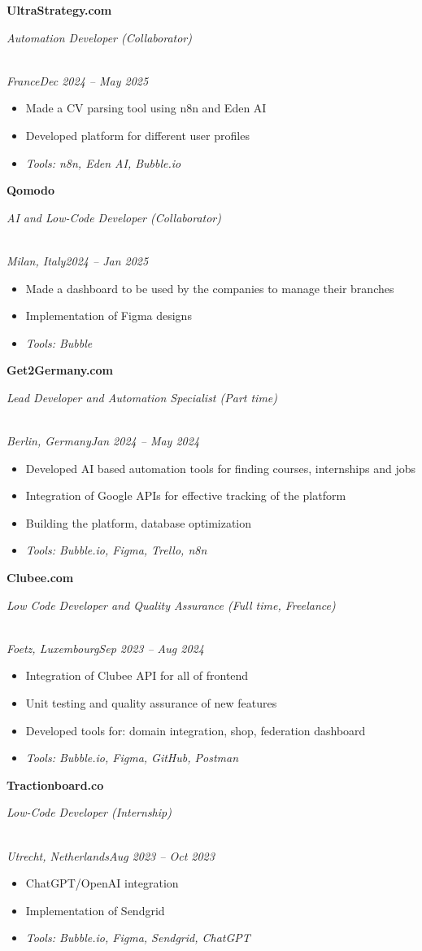 \documentclass[a4paper,10pt]{article}
\newcommand{\role}[4]{\vspace{3pt}\noindent\hspace{0.6em}\parbox[t]{0.38\textwidth}{\raggedright\textbf{#1}}\hfill\parbox[t]{0.58\textwidth}{\raggedleft\textit{#2}}\\{\textit{#3}\hfill\textit{#4}}\vspace{1pt}}
\begin{document}
\role{UltraStrategy.com}{Automation Developer (Collaborator)}{France}{Dec 2024 -- May 2025}
\begin{itemize}
\item Made a CV parsing tool using n8n and Eden AI
\item Developed platform for different user profiles
\item \textit{Tools: n8n, Eden AI, Bubble.io}
\end{itemize}

\role{Qomodo}{AI and Low-Code Developer (Collaborator)}{Milan, Italy}{2024 -- Jan 2025}
\begin{itemize}
\item Made a dashboard to be used by the companies to manage their branches
\item Implementation of Figma designs
\item \textit{Tools: Bubble}
\end{itemize}

\role{Get2Germany.com}{Lead Developer and Automation Specialist (Part time)}{Berlin, Germany}{Jan 2024 -- May 2024}
\begin{itemize}
\item Developed AI based automation tools for finding courses, internships and jobs
\item Integration of Google APIs for effective tracking of the platform
\item Building the platform, database optimization
\item \textit{Tools: Bubble.io, Figma, Trello, n8n}
\end{itemize}

\role{Clubee.com}{Low Code Developer and Quality Assurance (Full time, Freelance)}{Foetz, Luxembourg}{Sep 2023 -- Aug 2024}
\begin{itemize}
\item Integration of Clubee API for all of frontend
\item Unit testing and quality assurance of new features
\item Developed tools for: domain integration, shop, federation dashboard
\item \textit{Tools: Bubble.io, Figma, GitHub, Postman}
\end{itemize}

\role{Tractionboard.co}{Low-Code Developer (Internship)}{Utrecht, Netherlands}{Aug 2023 -- Oct 2023}
\begin{itemize}
\item ChatGPT/OpenAI integration
\item Implementation of Sendgrid
\item \textit{Tools: Bubble.io, Figma, Sendgrid, ChatGPT}
\end{itemize}
\end{document}
